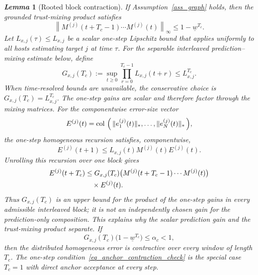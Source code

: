 \documentclass[letterpaper,journal]{IEEEtran}
\def\col#1{\mathop{{\rm col}\,\left(\,#1\,\right)}}
\newtheorem{lemma}{\it Lemma}%
\begin{document}
\begin{lemma}[Rooted block contraction]\label{lem_rooted_block_contraction}
If Assumption~\ref{ass_graph} holds, then the grounded trust-mixing product satisfies
\begin{equation}
    \left\|
    M^{(j)}(t+T_c-1)\cdots M^{(j)}(t)
    \right\|_{\infty}
    \le 1-\underline w^{T_c} .
    \label{eq_grounded_product_bound}
\end{equation}
Let $L_{x,j}(\tau)\le L_{x,j}$ be a scalar one-step Lipschitz bound that applies uniformly to all hosts estimating target $j$ at time $\tau$. For the separable interleaved prediction--mixing estimate below, define
\begin{equation}
    G_{x,j}(T_c)
    :=\sup_{t\ge0}\prod_{r=0}^{T_c-1}L_{x,j}(t+r)
    \le L_{x,j}^{T_c}.
\end{equation}
When time-resolved bounds are unavailable, the conservative choice is $G_{x,j}(T_c)=L_{x,j}^{T_c}$. The one-step gains are scalar and therefore factor through the mixing matrices. For the componentwise error-size vector
\begin{equation}\label{eq_E}
E^{(j)}(t)=\col{\|e_1^{(j)}(t)\|_*,\ldots,\|e_N^{(j)}(t)\|_*},
\end{equation}
the one-step homogeneous recursion satisfies, componentwise,
\begin{equation}
E^{(j)}(t+1)
\le L_{x,j}(t)M^{(j)}(t)E^{(j)}(t).
\end{equation}
Unrolling this recursion over one block gives
\begin{align}
E^{(j)}(t+T_c)
&\le G_{x,j}(T_c)
\big(M^{(j)}(t+T_c-1)\cdots M^{(j)}(t)\big)\notag\\
&\quad\times E^{(j)}(t).
\label{eq_componentwise_block_bound}
\end{align}
Thus $G_{x,j}(T_c)$ is an upper bound for the product of the one-step gains in every admissible interleaved block; it is not an independently chosen gain for the prediction-only composition. This explains why the scalar prediction gain and the trust-mixing product separate. If
\begin{equation}
    G_{x,j}(T_c)\big(1-\underline w^{T_c}\big)
    \le \alpha_c<1,
    \label{eq_window_contraction_check}
\end{equation}
then the distributed homogeneous error is contractive over every window of length $T_c$. The one-step condition~\eqref{eq_anchor_contraction_check} is the special case $T_c=1$ with direct anchor acceptance at every step.
\end{lemma}
\end{document}
